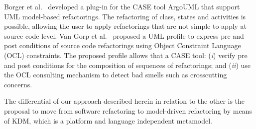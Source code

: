 Borger et al.~\cite{Boger2002} developed a plug-in for the CASE tool ArgoUML that support UML model-based refactorings. The refactoring of class, states and activities is possible, allowing the user to apply refactorings that are not simple to apply at source code level. 
Van Gorp et al.~\cite{Gorp2003} proposed a UML profile to express pre and post conditions of source code refactorings using Object Constraint Language (OCL) constraints. The proposed profile allows that a CASE tool: (\textit{i}) verify pre and post conditions for the composition of sequences of refactorings; and (\textit{ii}) use the OCL consulting mechanism to detect bad smells such as crosscutting concerns.

The differential of our approach described herein in relation to the other is the proposal to move from software refactoring to model-driven refactoring by means of KDM, which is a platform and language independent metamodel.
